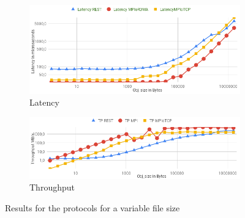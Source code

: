 \documentclass[runningheads]{llncs}
\begin{document}
\begin{figure}[!bt]
  \centering
  \begin{subfigure}[t]{0.7\textwidth}
        \includegraphics[width=1\textwidth]{latency-rest-mpi.png}\vspace{-0.2em}
        \caption{Latency}\vspace{-0.2em}
		\label{fig:latency-rest-mpi}
  \end{subfigure}
  \begin{subfigure}[t]{0.7\textwidth}
        \includegraphics[width=1\textwidth]{throughput-rest-mpi.png}\vspace{-0.2em}
        \caption{Throughput}\vspace{-0.2em}
		\label{fig:throughput-rest-mpi}
  \end{subfigure}
\caption{Results for the protocols for a variable file size}
\end{figure}
\end{document}

